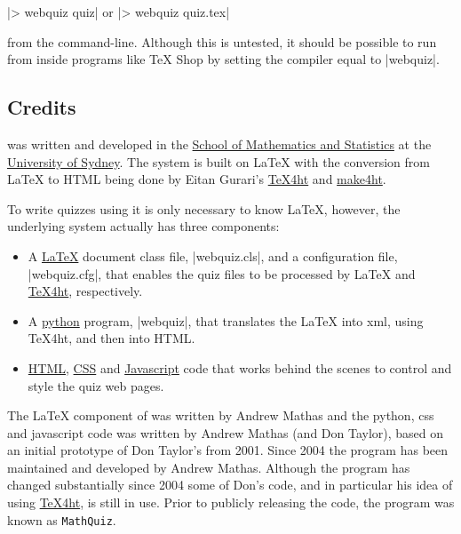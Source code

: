 \documentclass[svgnames]{article}
\newcommand\TeXfht{\href{https://www.ctan.org/tex4ht}{TeX4ht}\xspace}
\begin{document}
    \BashCode|> webquiz quiz| \qquad or \qquad
    \BashCode|> webquiz quiz.tex|

    \noindent from the command-line. Although this is untested, it
    should be possible to run \WebQuiz from inside programs like \TeX
    Shop by setting the compiler equal to \BashCode|webquiz|.

\subsection{Credits}
    \WebQuiz{} was written and developed in the
    \href{http://www.maths.usyd.edu.au/}{School of Mathematics and
    Statistics} at the \href{http://www.usyd.edu.au/}{University of
    Sydney}.  The system is built on \LaTeX{} with the conversion from
    \LaTeX{} to HTML being done by Eitan Gurari's
    \href{http://www.cis.ohio-state.edu/~gurari/TeXfht/mn.html}{TeX4ht}
    and
    \href{https://github.com/michal-h21/make4ht}{make4ht}.

    To write quizzes using \WebQuiz it is only necessary to know
    \LaTeX, however, the underlying \WebQuiz system actually has three
    components:
    \begin{itemize}
      \item A \href{https://www.latex-project.org/}{\LaTeX} document class
      file, \BashCode|webquiz.cls|, and a 
      configuration file, \BashCode|webquiz.cfg|, that enables the
      quiz files to be processed by \LaTeX{} and \TeXfht, respectively.
      \item A \href{https://www.python.org/}{python} program,
      \BashCode|webquiz|, that translates the
      \LaTeX{} into xml, using \TeX 4ht, and then into HTML.
      \item
      \href{https://www.w3schools.com/html/html_intro.asp}{HTML},
      \href{https://www.w3schools.com/css/}{CSS} and
      \href{https://www.w3schools.com/Js/}{Javascript}
      code that works behind the scenes to control and style the quiz
      web pages.
    \end{itemize}

   The \LaTeX{} component of \WebQuiz{} was written by Andrew Mathas
   and the python, css and javascript code was written by Andrew Mathas
   (and Don Taylor), based on an initial prototype of Don Taylor's from
   2001.  Since 2004 the program has been maintained and developed by
   Andrew Mathas. Although the program has changed substantially since
   2004 some of Don's code, and in particular his idea of using
   \TeXfht, is still in use. Prior to publicly releasing the code, the
   program was known as \texttt{MathQuiz}.
\end{document}

